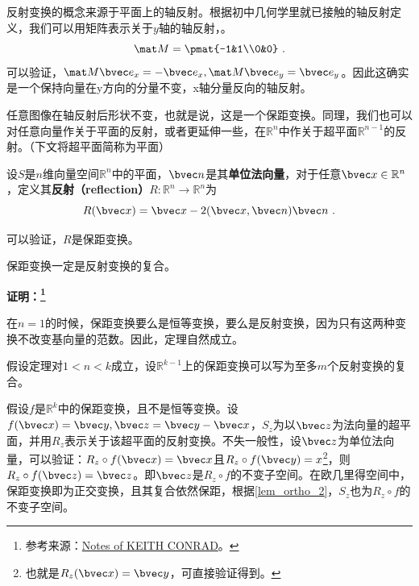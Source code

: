 
\begin{issues}
\issueMissDepend
\end{issues}

反射变换的概念来源于平面上的轴反射。根据初中几何学里就已接触的轴反射定义，我们可以用矩阵表示关于$y$轴的轴反射，。
\begin{equation}
\mat M=\pmat{-1&1\\0&0}~.
\end{equation}
可以验证，$\mat M\bvec e_x=-\bvec e_x,\mat M \bvec e_y=\bvec e_y$。因此这确实是一个保持向量在y方向的分量不变，x轴分量反向的轴反射。

任意图像在轴反射后形状不变，也就是说，这是一个保距变换。同理，我们也可以对任意向量作关于平面的反射，或者更延伸一些，在$\mathbb R^n$中作关于超平面$\mathbb R^{n-1}$的反射。（下文将超平面简称为平面）
\begin{definition}{}
设$S$是$n$维向量空间$\mathbb R^n$中的平面，$\bvec n$是其\textbf{单位法向量}，对于任意$\bvec x\in \mathbb R^n$，定义其\textbf{反射（reflection）}$R:\mathbb R^n\rightarrow \mathbb R^n$为
\begin{equation}
R(\bvec x)=\bvec x-2(\bvec x,\bvec n)\bvec n~.
\end{equation}
\end{definition}
可以验证，$R$是保距变换。


\begin{theorem}{}
保距变换一定是反射变换的复合。
\end{theorem}
\textbf{证明：\footnote{参考来源：\href{https://kconrad.math.uconn.edu/blurbs/grouptheory/isometryRn.pdf}{Notes of KEITH CONRAD}。}}

在$n=1$的时候，保距变换要么是恒等变换，要么是反射变换，因为只有这两种变换不改变基向量的范数。因此，定理自然成立。

假设定理对$1<n<k$成立，设$\mathbb R^{k-1}$上的保距变换可以写为至多$m$个反射变换的复合。 

假设$f$是$\mathbb R^k$中的保距变换，且不是恒等变换。设$f(\bvec x)=\bvec y,\bvec z=\bvec y-\bvec x$，$S_z$为以$\bvec z$为法向量的超平面，并用$R_z$表示关于该超平面的反射变换。不失一般性，设$\bvec z$为单位法向量，可以验证：$R_z\circ f(\bvec x)=\bvec x$且$R_z\circ f(\bvec y)=x$\footnote{也就是$R_z(\bvec x)=\bvec y$，可直接验证得到。}，则$R_z\circ f(\bvec z)=\bvec z$。即$\bvec z$是$R_z\circ f$的不变子空间。在欧几里得空间中，保距变换即为正交变换，且其复合依然保距，根据\autoref{lem_ortho_2}，$S_z$也为$R_z\circ f$的不变子空间。

